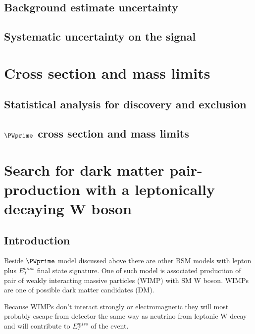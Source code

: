 \subsection{Background estimate uncertainty}
\subsection{Systematic uncertainty on the signal}

\section{Cross section and mass limits}
\subsection{Statistical analysis for discovery and exclusion}
\subsection{$\PWprime$ cross section and mass limits}



% 
% 


\section{Search for dark matter pair-production with a leptonically decaying W boson}
\label{chap:monoW}

\subsection{Introduction}

Beside $\PWprime$ model discussed above there are other BSM models 
with lepton plus $E_{T}^{miss}$ final state signature.
One of such model is associated 
production of pair of weakly interacting massive particles (WIMP)
with SM W boson. WIMPs are one of possible dark matter candidates (DM).

Because WIMPs don't interact strongly or electromagnetic they will most probably escape from detector the same way as neutrino
from leptonic W decay and will contribute to $E_{T}^{miss}$ of the event.

